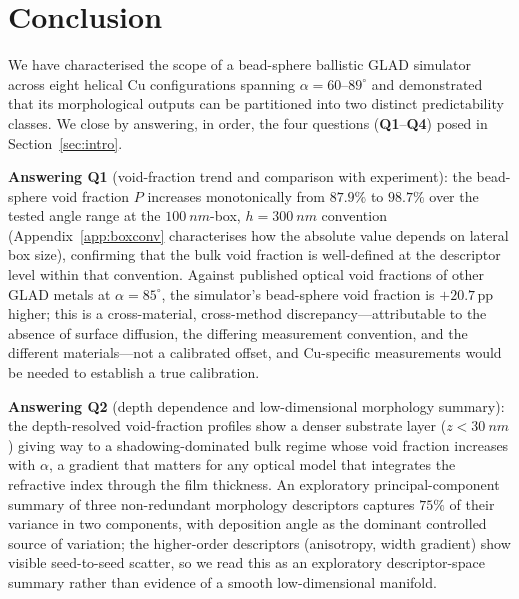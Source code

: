 \documentclass[aip,amsmath,amssymb,reprint]{revtex4-1}
\newcommand{\dang}{\ensuremath{\alpha}}
\newcommand{\bsP}{\ensuremath{P}}
\begin{document}
\section{Conclusion}
\label{sec:conclusion}

We have characterised the scope of a bead-sphere ballistic GLAD simulator
across eight helical Cu configurations spanning $\dang = 60$--$89^{\circ}$
and demonstrated that its morphological outputs can be partitioned into
two distinct predictability classes.  We close by answering, in order,
the four questions (\textbf{Q1}--\textbf{Q4}) posed in
Section~\ref{sec:intro}.

\textbf{Answering Q1} (void-fraction trend and comparison with
experiment): the bead-sphere void fraction $\bsP$
increases monotonically from $87.9\%$ to $98.7\%$ over the tested angle
range at the $\SI{100}{nm}$-box, $h=\SI{300}{nm}$ convention
(Appendix~\ref{app:boxconv} characterises how the absolute value depends
on lateral box size), confirming that the bulk void fraction is
well-defined at the descriptor level within that convention.
Against published optical void fractions of other GLAD metals at
$\dang = 85^{\circ}$, the simulator's bead-sphere void fraction is
$+20.7\,\mathrm{pp}$ higher; this is a cross-material, cross-method
discrepancy---attributable to the absence of surface diffusion, the
differing measurement convention, and the different materials---not a
calibrated offset, and Cu-specific measurements would be needed to
establish a true calibration.

\textbf{Answering Q2} (depth dependence and low-dimensional morphology
summary): the depth-resolved void-fraction profiles show a denser
substrate layer ($z<\SI{30}{nm}$) giving way to a shadowing-dominated bulk
regime whose void fraction increases with $\dang$, a gradient that matters
for any optical model that integrates the refractive index through the
film thickness.  An exploratory principal-component summary of three
non-redundant morphology descriptors captures $75\%$ of their variance in
two components, with deposition angle as the dominant controlled source of
variation; the higher-order descriptors (anisotropy, width gradient) show
visible seed-to-seed scatter, so we read this as an exploratory
descriptor-space summary rather than evidence of a smooth low-dimensional
manifold.
\end{document}
